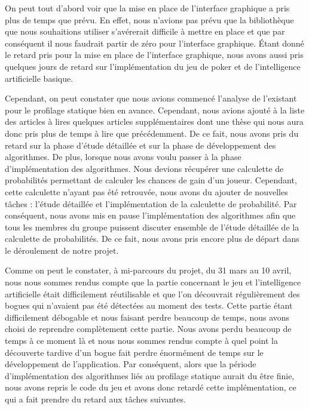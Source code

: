 \documentclass{report}
\begin{document}
On peut tout d'abord voir que la mise en place de l'interface graphique a pris plus de temps que prévu. En effet, nous n'avions pas prévu que la bibliothèque que nous souhaitions utiliser s’avérerait difficile à mettre en place et que par conséquent il nous faudrait partir de zéro pour l'interface graphique. Étant donné le retard pris pour la mise en place de l'interface graphique, nous avons aussi pris quelques jours de retard sur l'implémentation du jeu de poker et de l'intelligence artificielle basique. \par
Cependant, on peut constater que nous avions commencé l'analyse de l'existant pour le profilage statique bien en avance. Cependant, nous avions ajouté à la liste des articles à lires quelques articles supplémentaires dont une thèse qui nous aura donc pris plus de temps à lire que précédemment. De ce fait, nous avons pris du retard sur la phase d'étude détaillée et sur la phase de développement des algorithmes. De plus, lorsque nous avons voulu passer à la phase d'implémentation des algorithmes. Nous devions récupérer une calculette de probabilités permettant de calculer les chances de gain d'un joueur. Cependant, cette calculette n'ayant pas été retrouvée, nous avons du ajouter de nouvelles tâches : l'étude détaillée et l'implémentation de la calculette de probabilité. Par conséquent, nous avons mis en pause l'implémentation des algorithmes afin que tous les membres du groupe puissent discuter ensemble de l'étude détaillée de la calculette de probabilités. De ce fait, nous avons pris encore plus de départ dans le déroulement de notre projet. \par

Comme on peut le constater, à mi-parcours du projet, du 31 mars au 10 avril, nous nous sommes rendus compte que la partie concernant le jeu et l'intelligence artificielle était difficilement réutilisable et que l'on découvrait régulièrement des bogues qui n'avaient pas été détectées au moment des tests. Cette partie étant difficilement débogable et nous faisant perdre beaucoup de temps, nous avons choisi de reprendre complètement cette partie. Nous avons perdu beaucoup de temps à ce moment là et nous nous sommes rendus compte à quel point la découverte tardive d'un bogue fait perdre énormément de temps sur le développement de l'application. Par conséquent, alors que la période d'implémentation des algorithmes liés au profilage statique aurait du être finie, nous avons repris le code du jeu et avons donc retardé cette implémentation, ce qui a fait prendre du retard aux tâches suivantes.\par
\end{document}
